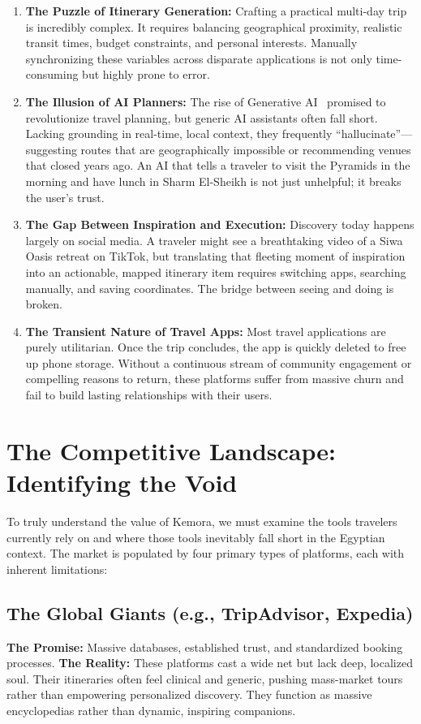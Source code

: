 \begin{enumerate}
    \item \textbf{The Puzzle of Itinerary Generation:} Crafting a practical multi-day trip is incredibly complex. It requires balancing geographical proximity, realistic transit times, budget constraints, and personal interests. Manually synchronizing these variables across disparate applications is not only time-consuming but highly prone to error.
    
    \item \textbf{The Illusion of AI Planners:} The rise of Generative AI~\cite{brown2020language} promised to revolutionize travel planning, but generic AI assistants often fall short. Lacking grounding in real-time, local context, they frequently ``hallucinate''---suggesting routes that are geographically impossible or recommending venues that closed years ago. An AI that tells a traveler to visit the Pyramids in the morning and have lunch in Sharm El-Sheikh is not just unhelpful; it breaks the user's trust.
    
    \item \textbf{The Gap Between Inspiration and Execution:} Discovery today happens largely on social media. A traveler might see a breathtaking video of a Siwa Oasis retreat on TikTok, but translating that fleeting moment of inspiration into an actionable, mapped itinerary item requires switching apps, searching manually, and saving coordinates. The bridge between seeing and doing is broken.
    
    \item \textbf{The Transient Nature of Travel Apps:} Most travel applications are purely utilitarian. Once the trip concludes, the app is quickly deleted to free up phone storage. Without a continuous stream of community engagement or compelling reasons to return, these platforms suffer from massive churn and fail to build lasting relationships with their users.
\end{enumerate}

\section{The Competitive Landscape: Identifying the Void}
To truly understand the value of Kemora, we must examine the tools travelers currently rely on and where those tools inevitably fall short in the Egyptian context. The market is populated by four primary types of platforms, each with inherent limitations:

\subsection{The Global Giants (e.g., TripAdvisor, Expedia)}
\textbf{The Promise:} Massive databases, established trust, and standardized booking processes.
\textbf{The Reality:} These platforms cast a wide net but lack deep, localized soul. Their itineraries often feel clinical and generic, pushing mass-market tours rather than empowering personalized discovery. They function as massive encyclopedias rather than dynamic, inspiring companions.

